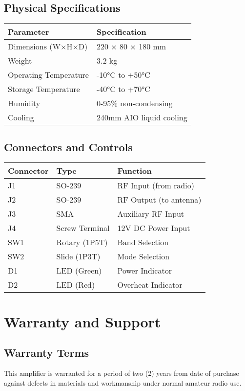 \documentclass[11pt,a4paper]{article}
\begin{document}
\subsection{Physical Specifications}
\begin{center}
\begin{tabular}{|l|l|}
\hline
\textbf{Parameter} & \textbf{Specification} \\
\hline
Dimensions (W×H×D) & 220 × 80 × 180 mm \\
Weight & 3.2 kg \\
Operating Temperature & -10°C to +50°C \\
Storage Temperature & -40°C to +70°C \\
Humidity & 0-95\% non-condensing \\
Cooling & 240mm AIO liquid cooling \\
\hline
\end{tabular}
\end{center}

\subsection{Connectors and Controls}
\begin{center}
\begin{tabular}{|l|l|l|}
\hline
\textbf{Connector} & \textbf{Type} & \textbf{Function} \\
\hline
J1 & SO-239 & RF Input (from radio) \\
J2 & SO-239 & RF Output (to antenna) \\
J3 & SMA & Auxiliary RF Input \\
J4 & Screw Terminal & 12V DC Power Input \\
SW1 & Rotary (1P5T) & Band Selection \\
SW2 & Slide (1P3T) & Mode Selection \\
D1 & LED (Green) & Power Indicator \\
D2 & LED (Red) & Overheat Indicator \\
\hline
\end{tabular}
\end{center}

\section{Warranty and Support}

\subsection{Warranty Terms}
This amplifier is warranted for a period of two (2) years from date of purchase against defects in materials and workmanship under normal amateur radio use.
\end{document}
